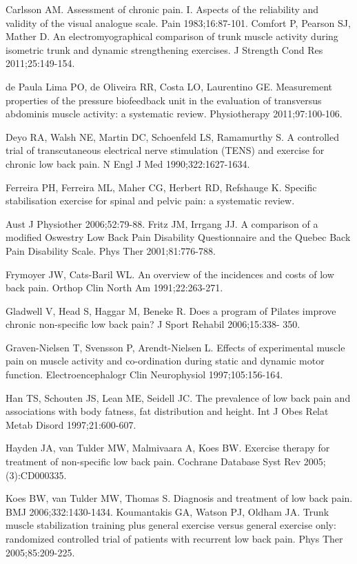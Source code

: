 \documentclass[a5paper]{article}
\theoremstyle{definition}
\begin{document}
Carlsson AM. Assessment of chronic pain. I. Aspects of the reliability and
validity of the visual analogue scale. Pain 1983;16:87-101.
Comfort P, Pearson SJ, Mather D. An electromyographical comparison of
trunk muscle activity during isometric trunk and dynamic strengthening exercises. J Strength Cond Res 2011;25:149-154.

de Paula Lima PO, de Oliveira RR, Costa LO, Laurentino GE. Measurement properties of the pressure biofeedback unit in the evaluation of
transversus abdominis muscle activity: a systematic review. Physiotherapy 2011;97:100-106.

Deyo RA, Walsh NE, Martin DC, Schoenfeld LS, Ramamurthy S. A controlled trial of transcutaneous electrical nerve stimulation (TENS) and
exercise for chronic low back pain. N Engl J Med 1990;322:1627-1634.

Ferreira PH, Ferreira ML, Maher CG, Herbert RD, Refshauge K. Specific
stabilisation exercise for spinal and pelvic pain: a systematic review.

Aust J Physiother 2006;52:79-88.
Fritz JM, Irrgang JJ. A comparison of a modified Oswestry Low Back Pain
Disability Questionnaire and the Quebec Back Pain Disability Scale.
Phys Ther 2001;81:776-788.

Frymoyer JW, Cats-Baril WL. An overview of the incidences and costs of
low back pain. Orthop Clin North Am 1991;22:263-271.

Gladwell V, Head S, Haggar M, Beneke R. Does a program of Pilates improve chronic non-specific low back pain? J Sport Rehabil 2006;15:338-
350.

Graven-Nielsen T, Svensson P, Arendt-Nielsen L. Effects of experimental
muscle pain on muscle activity and co-ordination during static and
dynamic motor function. Electroencephalogr Clin Neurophysiol
1997;105:156-164.

Han TS, Schouten JS, Lean ME, Seidell JC. The prevalence of low back
pain and associations with body fatness, fat distribution and height.
Int J Obes Relat Metab Disord 1997;21:600-607.

Hayden JA, van Tulder MW, Malmivaara A, Koes BW. Exercise therapy
for treatment of non-specific low back pain. Cochrane Database Syst
Rev 2005;(3):CD000335.

Koes BW, van Tulder MW, Thomas S. Diagnosis and treatment of low
back pain. BMJ 2006;332:1430-1434.
Koumantakis GA, Watson PJ, Oldham JA. Trunk muscle stabilization
training plus general exercise versus general exercise only: randomized controlled trial of patients with recurrent low back pain. Phys
Ther 2005;85:209-225.
\end{document}
